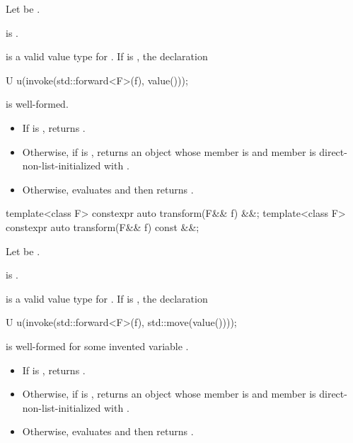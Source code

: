 \begin{itemdescr}
\pnum
Let  be
.

\pnum
\constraints
{} is .

\pnum
\mandates
{} is a valid value type for .
If  is ,
the declaration
\begin{codeblock}
U u(invoke(std::forward<F>(f), value()));
\end{codeblock}
is well-formed.

\pnum
\effects
\begin{itemize}
\item
If  is , returns
.
\item
Otherwise, if  is , returns an
 object whose  member is 
and  member is direct-non-list-initialized with
.
\item
Otherwise, evaluates  and then
returns .
\end{itemize}
\end{itemdescr}

%
\begin{itemdecl}
template<class F> constexpr auto transform(F&& f) &&;
template<class F> constexpr auto transform(F&& f) const &&;
\end{itemdecl}

\begin{itemdescr}
\pnum
Let  be
.

\pnum
\constraints
{} is .

\pnum
\mandates
{} is a valid value type for . If  is
, the declaration
\begin{codeblock}
U u(invoke(std::forward<F>(f), std::move(value())));
\end{codeblock}
is well-formed for some invented variable .

\pnum
\effects
\begin{itemize}
\item
If  is , returns
.
\item
Otherwise, if  is , returns an
 object whose  member is 
and  member is direct-non-list-initialized with
.
\item
Otherwise, evaluates  and
then returns .
\end{itemize}
\end{itemdescr}

